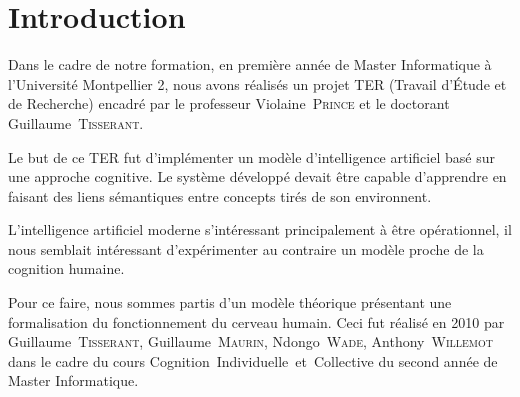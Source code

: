 \chapter*{Introduction}
Dans le cadre de notre formation, en première année de Master Informatique à l'Université Montpellier 2, nous avons réalisés un projet TER (Travail d'Étude et de Recherche) encadré par le professeur \mbox{Violaine \textsc{Prince}} et le doctorant \mbox{Guillaume \textsc{Tisserant}}.

Le but de ce TER fut d'implémenter un modèle d'intelligence artificiel basé sur une approche cognitive. Le système développé devait être capable d'apprendre en faisant des liens sémantiques entre concepts tirés de son environnent. 

L'intelligence artificiel moderne s'intéressant principalement à être opérationnel, il nous semblait intéressant d'expérimenter au contraire un modèle proche de la cognition humaine. 

Pour ce faire, nous sommes partis d'un modèle théorique présentant une formalisation du fonctionnement du cerveau humain. Ceci fut réalisé en 2010 par \mbox{Guillaume \textsc{Tisserant}}, \mbox{Guillaume \textsc{Maurin}}, \mbox{Ndongo \textsc{Wade}}, \mbox{Anthony \textsc{Willemot}} dans le cadre du cours \mbox{\og Cognition Individuelle et Collective\fg{}} du second année de Master Informatique.

